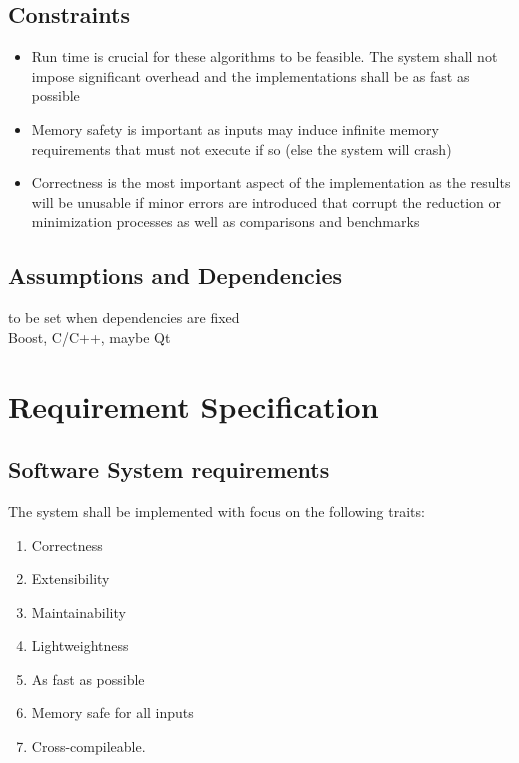         \subsection{Constraints}
            \begin{itemize}
                \item Run time is crucial for these algorithms to be feasible. The system shall not impose significant overhead and the implementations shall be as fast as possible
                \item Memory safety is important as inputs may induce infinite memory requirements that must not execute if so (else the system will crash)
                \item Correctness is the most important aspect of the implementation as the results will be unusable if minor errors are introduced that corrupt the reduction or minimization processes as well as comparisons and benchmarks
            \end{itemize}

        \subsection{Assumptions and Dependencies}
            to be set when dependencies are fixed \\
            Boost, C/C++, maybe Qt
    \newpage       
    
    
    \section{Requirement Specification}
        \subsection{Software System requirements}
            The system shall be implemented with focus on the following traits:
            \begin{enumerate}[S 1.]
                    \item Correctness
                    \item Extensibility
                    \item Maintainability
                    \item Lightweightness
                    \item As fast as possible
                    \item Memory safe for all inputs
                    \item Cross-compileable.
            \end{enumerate}  
    
